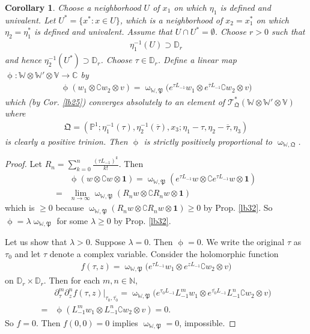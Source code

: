 \documentclass[11pt,b5paper,notitlepage]{article}
\theoremstyle{definition}
\theoremstyle{plain}
\newtheorem{co}[df]{Corollary}
\newcommand{\fk}{\mathfrak}
\newcommand{\ovl}{\overline}
\newcommand{\id}{\mathbf{1}}
\newcommand{\scr}{\mathscr}
\newcommand{\Co}{\complement}
\newcommand{\Vbb}{\mathbb V}
\newcommand{\Wbb}{\mathbb W}
\newcommand{\Cbb}{\mathbb C}
\newcommand{\Nbb}{\mathbb N}
\newcommand{\Pbb}{\mathbb P}
\newcommand{\Dbb}{\mathbb D}
\numberwithin{equation}{section}
\begin{document}
\begin{co}\label{lb43}
Choose a neighborhood $U$ of $x_1$ on which $\eta_1$ is defined and univalent. Let $U^*=\{x^*:x\in U\}$, which is a neighborhood of $x_2=x_1^*$ on which $\eta_2=\eta_1^*$ is defined and univalent. Assume that $U\cap U^*=\emptyset$.  Choose $r>0$ such that
\begin{align*}
\eta_1^{-1}(U)\supset\Dbb_r
\end{align*}
and hence $\eta_2^{-1}(U^*)\supset\Dbb_r$. Choose $\tau\in\Dbb_r$. Define a linear map $\upphi:\Wbb\otimes\Wbb'\otimes\Vbb\rightarrow\Cbb$ by 
\begin{align*}
\upphi(w_1\otimes \Co w_2\otimes v)=\upomega_{\Wbb,\fk P}\big(e^{\tau L_{-1}}w_1\otimes e^{\ovl\tau L_{-1}}\Co w_2\otimes v \big)
\end{align*}
which (by Cor. \ref{lb25}) converges absolutely to an element of $\scr T_{\fk Q}^*(\Wbb\otimes\Wbb'\otimes\Vbb)$ where
\begin{align*}
\fk Q=(\Pbb^1;\eta_1^{-1}(\tau),\eta_2^{-1}(\ovl\tau),x_3;\eta_1-\tau,\eta_2-\ovl\tau,\eta_3)
\end{align*}
is clearly a positive trinion. Then $\upphi$ is strictly positively proportional to $\upomega_{\Wbb,\fk Q}$.
\end{co}

\begin{proof}
Let $R_n=\sum_{k=0}^n\frac{(\tau L_{-1})^k}{k!}$. Then
\begin{align*}
&\upphi(w\otimes\Co w\otimes\id)=\upomega_{\Wbb,\fk P}(e^{\tau L_{-1}}w\otimes \Co e^{\tau L_{-1}}w\otimes \id)\\
=&\lim_{n\rightarrow \infty} \upomega_{\Wbb,\fk P}(R_n w\otimes \Co R_n w\otimes\id)
\end{align*}
which is $\geq 0$ because $\upomega_{\Wbb,\fk P}(R_n w\otimes \Co R_n w\otimes\id)\geq 0$ by Prop. \ref{lb32}. So $\upphi=\lambda\upomega_{\Wbb,\fk P}$ for some $\lambda\geq 0$ by Prop. \ref{lb32}. 

Let us show that $\lambda>0$. Suppose $\lambda=0$. Then $\upphi=0$. We write the original $\tau$ as $\tau_0$ and let $\tau$ denote a complex variable. Consider the holomorphic function
\begin{align*}
f(\tau,z)=\upomega_{\Wbb,\fk P}\big(e^{\tau L_{-1}}w_1\otimes e^{z L_{-1}}\Co w_2\otimes v \big)
\end{align*} 
on $\Dbb_r\times\Dbb_r$. Then for each $m,n\in\Nbb$,
\begin{align*}
&\partial_\tau^m\partial_z^n f(\tau,z)|_{\tau_0,\ovl{\tau_0}}=\upomega_{\Wbb,\fk P}\big(e^{\tau_0 L_{-1}}L_{-1}^mw_1\otimes e^{\ovl{\tau_0} L_{-1}}L_{-1}^n\Co w_2\otimes v \big)\\
=&\upphi(L_{-1}^mw_1\otimes L_{-1}^n\Co w_2\otimes v)=0.
\end{align*}
So $f= 0$. Then $f(0,0)=0$ implies $\upomega_{\Wbb,\fk P}=0$, impossible.
\end{proof}
\end{document}
